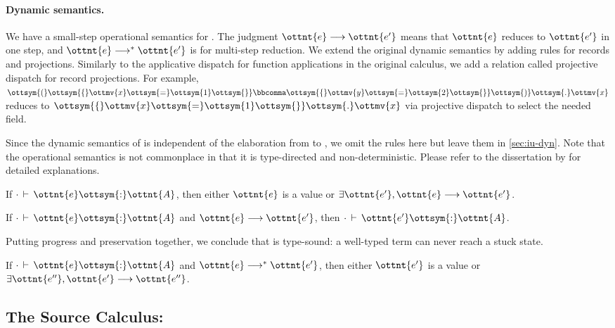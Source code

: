 \paragraph{Dynamic semantics.}
We have a small-step operational semantics for \lambdaiu. The judgment
$\ottnt{e}\longrightarrow\ottnt{e'}$ means that $\ottnt{e}$ reduces to $\ottnt{e'}$ in one step,
and $\ottnt{e}\longrightarrow^*\ottnt{e'}$ is for multi-step reduction. We extend the
original dynamic semantics by adding rules for records and projections.
Similarly to the applicative dispatch for function applications in the original
calculus, we add a relation called projective dispatch for record projections.
For example, $\ottsym{(}  \ottsym{\{}  \ottmv{x}  \ottsym{=}  \ottsym{1}  \ottsym{\}}  \bbcomma  \ottsym{\{}  \ottmv{y}  \ottsym{=}  \ottsym{2}  \ottsym{\}}  \ottsym{)}  \ottsym{.}  \ottmv{x}$ reduces to $\ottsym{\{}  \ottmv{x}  \ottsym{=}  \ottsym{1}  \ottsym{\}}  \ottsym{.}  \ottmv{x}$ via
projective dispatch to select the needed field.

Since the dynamic semantics of \lambdaiu is independent of the elaboration from
\uaena to \lambdaiu, we omit the rules here but leave them in
\autoref{sec:iu-dyn}. Note that the operational semantics is not commonplace in
that it is type-directed and non-deterministic. Please refer to the dissertation
by \citet{rehman2023blend} for detailed explanations.

\begin{theorem}[Progress]
  If $ \cdot   \,\vdash\,  \ottnt{e}  \ottsym{:}  \ottnt{A}$, then either $\ottnt{e}$ is a value or $\exists \ottnt{e'}, \ottnt{e} \longrightarrow \ottnt{e'}$.
\end{theorem}
\begin{theorem}[Preservation]
  If $ \cdot   \,\vdash\,  \ottnt{e}  \ottsym{:}  \ottnt{A}$ and $\ottnt{e} \longrightarrow \ottnt{e'}$, then $ \cdot   \,\vdash\,  \ottnt{e'}  \ottsym{:}  \ottnt{A}$.
\end{theorem}
Putting progress and preservation together, we conclude that \lambdaiu is type-sound:
a well-typed term can never reach a stuck state.
\begin{corollary}
  If $ \cdot   \,\vdash\,  \ottnt{e}  \ottsym{:}  \ottnt{A}$ and $\ottnt{e} \longrightarrow^* \ottnt{e'}$, then either $\ottnt{e'}$ is a value or $\exists \ottnt{e''}, \ottnt{e'} \longrightarrow \ottnt{e''}$.
\end{corollary}

\subsection{The Source Calculus: \uaena} \label{sec:uaena}

